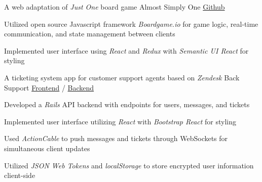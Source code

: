 \vspace{-2.0mm}

\begin{cventries}

  \cventry
    {A web adaptation of \textit{Just One} board game} %
    {Almost Simply One} %
    {\href{https://github.com/jhcheung/almost-simply-one}{Github}} %
    {} %
    {
      \begin{cvitems} %
		\item {Utilized open source Javascript framework \textit{Boardgame.io} for game logic, real-time communication, and state management between clients}
        \item {Implemented user interface using \textit{React} and \textit{Redux} with \textit{Semantic UI React} for styling}      
    \end{cvitems}
    }

  \cventry
    {A ticketing system app for customer support agents based on \textit{Zendesk}} %
    {Back Support} %
    {\href{https://github.com/jhcheung/backsupport-client}{Frontend} / \href{https://github.com/jhcheung/backsupport-backend}{Backend}} %
    {} %
    {
      \begin{cvitems} %
		\item {Developed a \textit{Rails} API backend with endpoints for users, messages, and tickets}
		\item {Implemented user interface utilizing \textit{React} with \textit{Bootstrap React} for styling}
		\item {Used \textit{ActionCable} to push messages and tickets through WebSockets for simultaneous client updates}
        \item {Utilized \textit{JSON Web Tokens} and \textit{localStorage} to store encrypted user information client-side}      
    \end{cvitems}
    }


\end{cventries}
